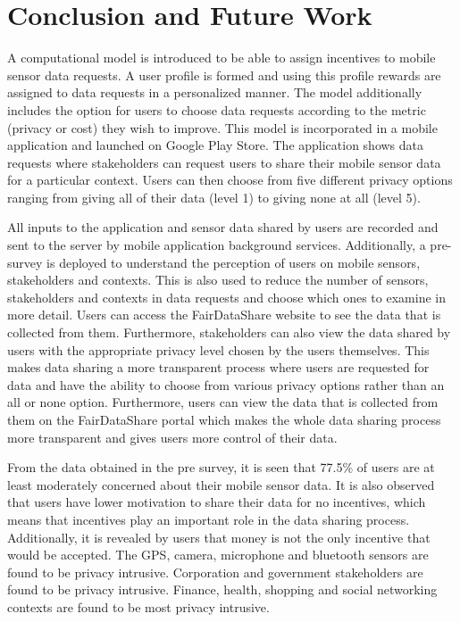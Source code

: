 \chapter{Conclusion and Future Work}

A computational model is introduced to be able to assign incentives to mobile sensor data requests. A user profile is formed and using this profile rewards are assigned to data requests in a personalized manner. The model additionally includes the option for users to choose data requests according to the metric (privacy or cost) they wish to improve. This model is incorporated in a mobile application and launched on Google Play Store. The application shows data requests where stakeholders can request users to share their mobile sensor data for a particular context. Users can then choose from five different privacy options ranging from giving all of their data (level 1) to giving none at all (level 5). 

All inputs to the application and sensor data shared by users are recorded and sent to the server by mobile application background services. Additionally, a pre-survey is deployed to understand the perception of users on mobile sensors, stakeholders and contexts. This is also used to reduce the number of sensors, stakeholders and contexts in data requests and choose which ones to examine in more detail. Users can access the FairDataShare website to see the data that is collected from them. Furthermore, stakeholders can also view the data shared by users with the appropriate privacy level chosen by the users themselves. This makes data sharing a more transparent process where users are requested for data and have the ability to choose from various privacy options rather than an all or none option. Furthermore, users can view the data that is collected from them on the FairDataShare portal which makes the whole data sharing process more transparent and gives users more control of their data.

From the data obtained in the pre survey, it is seen that 77.5\% of users are at least moderately concerned about their mobile sensor data. It is also observed that users have lower motivation to share their data for no incentives, which means that incentives play an important role in the data sharing process. Additionally, it is revealed by users that money is not the only incentive that would be accepted. The GPS, camera, microphone and bluetooth sensors are found to be privacy intrusive. Corporation and government stakeholders are found to be privacy intrusive. Finance, health, shopping and social networking contexts are found to be most privacy intrusive.

